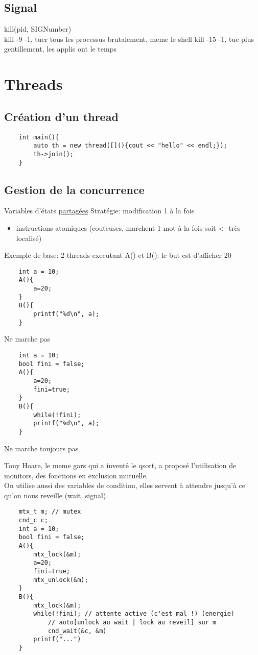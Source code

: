 \documentclass[11pt]{article}
\begin{document}
\subsection{Signal}
kill(pid, SIGNumber)\\
kill -9 -1, tuer tous les processus brutalement, meme le shell
kill -15 -1, tue plus gentillement, les applis ont le temps

\pagebreak

\section{Threads}
\subsection{Création d'un thread}

\begin{verbatim}
	int main(){
		auto th = new thread([](){cout << "hello" << endl;});
		th->join();
	}	
\end{verbatim}

\subsection{Gestion de la concurrence}
Variables d'états \underline{partagées}
Stratégie: modification 1 à la fois
\begin{itemize}
	\item instructions atomiques (couteuses, marchent 1 mot à la fois soit <- très localisé)\\
\end{itemize}

Exemple de base: 2 threads executant A() et B(): le but est d'afficher 20
\begin{verbatim}
	int a = 10;
	A(){
		a=20;
	}
	B(){
		printf("%d\n", a);
	}
\end{verbatim}
Ne marche pas

\begin{verbatim}
	int a = 10;
	bool fini = false;
	A(){
		a=20;
		fini=true;
	}
	B(){
		while(!fini);
		printf("%d\n", a);
	}
\end{verbatim}
Ne marche toujours pas

\pagebreak


Tony Hoare, le meme gars qui a inventé le qsort, a proposé l'utilisation de monitors, des fonctions en exclusion mutuelle. \\
On utilise aussi des variables de condition, elles servent à attendre jusqu'à ce qu'on nous reveille (wait, signal).

\begin{verbatim}
	mtx_t m; // mutex
	cnd_c c;
	int a = 10;
	bool fini = false;
	A(){
		mtx_lock(&m);
		a=20;
		fini=true;
		mtx_unlock(&m);
	}
	B(){
		mtx_lock(&m);
		while(!fini); // attente active (c'est mal !) (energie)
			// auto[unlock au wait | lock au reveil] sur m
			cnd_wait(&c, &m) 
		printf("...")
	}
\end{verbatim}
\end{document}
